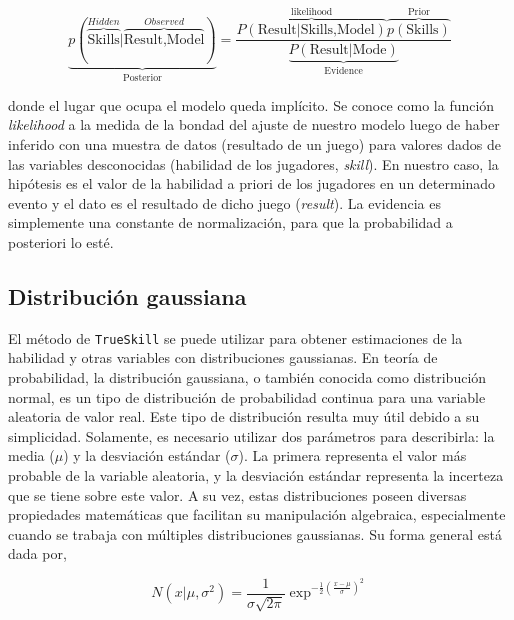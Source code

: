 \documentclass[11pt,twoside,spanish]{report} %
\begin{document}
\begin{equation}\label{eq:inference}
\underbrace{p(\overbrace{\text{Skills}}^{Hidden}|\overbrace{\text{Result,Model}}^{Observed})}_{\text{Posterior}} = \frac{\overbrace{P(\text{Result}|\text{Skills,Model})}^{\text{likelihood}}\overbrace{p(\text{Skills})}^{\text{Prior}}}{\underbrace{P(\text{Result}|\text{Mode})}_{\text{Evidence}}}
\end{equation}

donde el lugar que ocupa el modelo queda impl\'icito.
Se conoce como la funci\'on \textit{likelihood}  a la medida de la bondad del ajuste de nuestro modelo luego de haber inferido con una muestra de datos (resultado de un juego) para valores dados de las variables desconocidas (habilidad de los jugadores, \textit{skill}).
En nuestro caso, la hip\'otesis es el valor de la habilidad a priori de los jugadores en un determinado evento y el dato es el resultado de dicho juego (\textit{result}).
La evidencia es simplemente una constante de normalizaci\'on, para que la probabilidad a posteriori lo est\'e.




\subsection{Distribuci\'on gaussiana}\label{Sec:PropiedadesGaussianas}

El m\'etodo de \texttt{TrueSkill} se puede utilizar para obtener estimaciones de la habilidad y otras variables con distribuciones gaussianas.
En teor\'ia de probabilidad, la distribuci\'on gaussiana, o tambi\'en conocida como distribuci\'on normal, es un tipo de distribuci\'on de probabilidad continua para una variable aleatoria de valor real.
Este tipo de distribuci\'on resulta muy \'util debido a su simplicidad. 
Solamente, es necesario utilizar dos par\'ametros para describirla: la media ($\mu$) y la desviaci\'on est\'andar ($\sigma$).
La primera representa el valor m\'as probable de la variable aleatoria, y la desviaci\'on est\'andar representa la incerteza que se tiene sobre este valor.
A su vez, estas distribuciones poseen diversas propiedades matem\'aticas que facilitan su manipulaci\'on algebraica, especialmente cuando se trabaja con m\'ultiples distribuciones gaussianas.
Su forma general est\'a dada por,

\begin{equation}
N(x|\mu, \sigma^2)=\frac{1}{\sigma\sqrt{2\pi}}\exp^{-\frac{1}{2}\left(\frac{x-\mu}{\sigma}\right)^2} \label{ec:gauss}
\end{equation}
\end{document}
